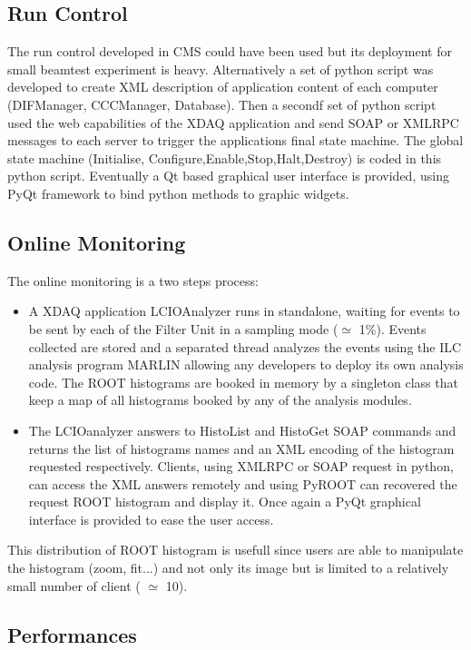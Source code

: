 \documentclass[english]{article}
\begin{document}
\subsection{Run Control}
The run control developed in CMS could have been used but its deployment for small beamtest experiment is heavy. Alternatively a set of python script was developed to create XML description of application content of each computer (DIFManager, CCCManager, Database). Then a secondf set of python script used the web capabilities of the XDAQ application and send SOAP or XMLRPC messages to each server to trigger the applications final state machine. 
The global state machine (Initialise, Configure,Enable,Stop,Halt,Destroy) is coded in this python script. Eventually a Qt based graphical user interface is provided, using PyQt \cite{PyQt} framework to bind python methods to graphic widgets. 
\subsection{Online Monitoring}

The online monitoring is a two steps process:
\begin{itemize}
\item A XDAQ application LCIOAnalyzer runs in standalone, waiting for events to be sent by each of the Filter Unit in a sampling mode ($\simeq$ 1\%). Events collected are stored and a separated thread analyzes the events using the ILC analysis program MARLIN \cite{MARLIN} allowing any developers to deploy its own analysis code. The ROOT histograms are booked in memory by a singleton class that keep a map of all histograms booked by any of the analysis modules.

\item The LCIOanalyzer answers to HistoList and HistoGet SOAP commands and returns the list of histograms names and an XML encoding of the histogram requested respectively. Clients, using XMLRPC or SOAP request in python, can 
access the XML answers remotely and using PyROOT \cite{PyROOT} can recovered the request ROOT histogram and display it. Once again a PyQt graphical interface is provided to ease the user access. 
\end{itemize}
This distribution of ROOT histogram is usefull since users are able to manipulate the histogram (zoom, fit...) and not only its image but is limited to a relatively small number of client ( $\simeq$ 10).
\subsection{Performances}
\end{document}
